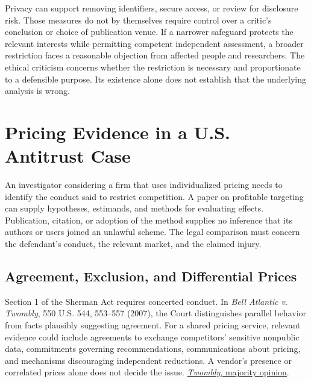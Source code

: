 Privacy can support removing identifiers, secure access, or review for
disclosure risk. Those measures do not by themselves require control
over a critic's conclusion or choice of publication venue. If a narrower
safeguard protects the relevant interests while permitting competent
independent assessment, a broader restriction faces a reasonable
objection from affected people and researchers. The ethical criticism
concerns whether the restriction is necessary and proportionate to a
defensible purpose. Its existence alone does not establish that the
underlying analysis is wrong.


\hypertarget{M09-pricing-evidence-in-a-u.s.-antitrust-case}{%
\section{Pricing Evidence in a U.S. Antitrust
Case}\label{M09-pricing-evidence-in-a-u.s.-antitrust-case}}

\noindent \noindent An investigator considering a firm that uses individualized
pricing needs to identify the conduct said to restrict competition. A
paper on profitable targeting can supply hypotheses, estimands, and
methods for evaluating effects. Publication, citation, or adoption of
the method supplies no inference that its authors or users joined an
unlawful scheme. The legal comparison must concern the defendant's
conduct, the relevant market, and the claimed injury.

\hypertarget{M09-agreement-exclusion-and-differential-prices}{%
\subsection{Agreement, Exclusion, and Differential
Prices}\label{M09-agreement-exclusion-and-differential-prices}}

\noindent \noindent Section 1 of the Sherman Act requires concerted conduct. In
\emph{Bell Atlantic v. Twombly}, 550 U.S. 544, 553--557 (2007), the
Court distinguishes parallel behavior from facts plausibly suggesting
agreement. For a shared pricing service, relevant evidence could include
agreements to exchange competitors' sensitive nonpublic data,
commitments governing recommendations, communications about pricing, and
mechanisms discouraging independent reductions. A vendor's presence or
correlated prices alone does not decide the issue.
\href{https://www.law.cornell.edu/supct/html/05-1126.ZO.html}{\emph{Twombly},
majority opinion}.

